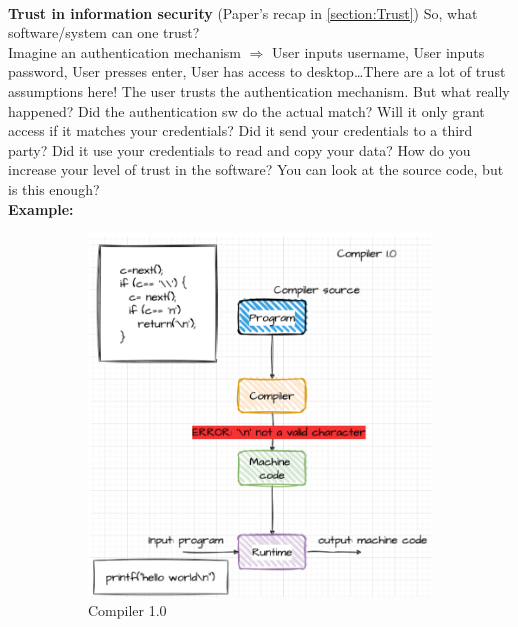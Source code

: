 \\\textbf{Trust in information security} (Paper's recap in \ref{section:Trust})
So, what software/system can one trust?
\\Imagine an authentication mechanism $\Rightarrow$ User inputs username, User inputs password, User presses enter, User has access to desktop…There are a lot of trust assumptions here!
The user trusts the authentication mechanism. But what really happened? Did the authentication sw do the actual match? Will it only grant access if it matches your credentials? Did it send your credentials to a third party? Did it use your credentials to read and copy your data?
How do you increase your level of trust in the software? You can look at the source code, but is this enough?
\\\textbf{Example:}
\begin{figure}[h]
    \centering
    \begin{subfigure}[b]{0.4\textwidth}
        \centering
        \includegraphics[width=\textwidth]{Figures/Compiler0.png}
        \caption{Compiler 1.0}
        \label{Compiler 1.0}
    \end{subfigure}
    \hfill
    \begin{subfigure}[b]{0.4\textwidth}
        \centering

\end{subfigure}
\end{figure}
